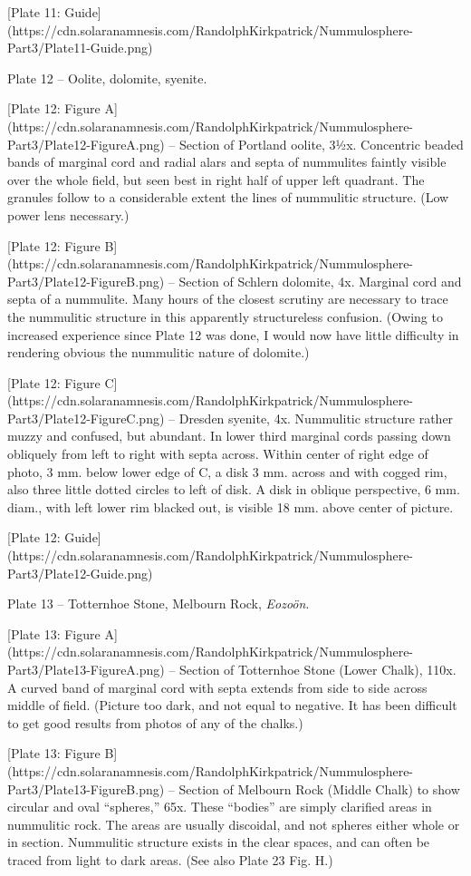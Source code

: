 \documentclass[a4paper, 12pt, oneside]{article}
\begin{document}
[Plate 11: Guide](https://cdn.solaranamnesis.com/RandolphKirkpatrick/Nummulosphere-Part3/Plate11-Guide.png)

Plate 12 -- Oolite, dolomite, syenite.

[Plate 12: Figure A](https://cdn.solaranamnesis.com/RandolphKirkpatrick/Nummulosphere-Part3/Plate12-FigureA.png) -- Section of Portland oolite, 3½x. Concentric beaded bands of marginal cord and radial alars and septa of nummulites faintly visible over the whole field, but seen best in right half of upper left quadrant. The granules follow to a considerable extent the lines of nummulitic structure. (Low power lens necessary.)

[Plate 12: Figure B](https://cdn.solaranamnesis.com/RandolphKirkpatrick/Nummulosphere-Part3/Plate12-FigureB.png) -- Section of Schlern dolomite, 4x. Marginal cord and septa of a nummulite. Many hours of the closest scrutiny are necessary to trace the nummulitic structure in this apparently structureless confusion. (Owing to increased experience since Plate 12 was done, I would now have little difficulty in rendering obvious the nummulitic nature of dolomite.)

[Plate 12: Figure C](https://cdn.solaranamnesis.com/RandolphKirkpatrick/Nummulosphere-Part3/Plate12-FigureC.png) -- Dresden syenite, 4x. Nummulitic structure rather muzzy and confused, but abundant. In lower third marginal cords passing down obliquely from left to right with septa across. Within center of right edge of photo, 3 mm. below lower edge of C, a disk 3 mm. across and with cogged rim, also three little dotted circles to left of disk. A disk in oblique perspective, 6 mm. diam., with left lower rim blacked out, is visible 18 mm. above center of picture.

[Plate 12: Guide](https://cdn.solaranamnesis.com/RandolphKirkpatrick/Nummulosphere-Part3/Plate12-Guide.png)

Plate 13 -- Totternhoe Stone, Melbourn Rock, \emph{Eozoön}.

[Plate 13: Figure A](https://cdn.solaranamnesis.com/RandolphKirkpatrick/Nummulosphere-Part3/Plate13-FigureA.png) -- Section of Totternhoe Stone (Lower Chalk), 110x. A curved band of marginal cord with septa extends from side to side across middle of field. (Picture too dark, and not equal to negative. It has been difficult to get good results from photos of any of the chalks.)

[Plate 13: Figure B](https://cdn.solaranamnesis.com/RandolphKirkpatrick/Nummulosphere-Part3/Plate13-FigureB.png) -- Section of Melbourn Rock (Middle Chalk) to show circular and oval ``spheres,'' 65x. These ``bodies'' are simply clarified areas in nummulitic rock. The areas are usually discoidal, and not spheres either whole or in section. Nummulitic structure exists in the clear spaces, and can often be traced from light to dark areas. (See also Plate 23 Fig. H.)
\end{document}
